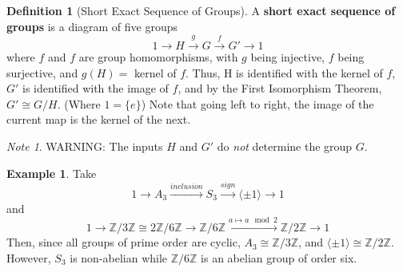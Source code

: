 \documentclass[12pt]{article}
\theoremstyle{definition}
\newtheorem{defn}[thm]{Definition}
\newtheorem{eg}[thm]{Example}
\theoremstyle{remark}
\newtheorem*{note}{Note} %
\numberwithin{equation}{section}
\newcommand\Z{\mathbb Z}    %
\newcommand\B[1]{\textbf{ #1}}
\begin{document}
\begin{defn}[Short Exact Sequence of Groups]
        A \B{short exact sequence of groups} is a diagram of five groups \begin{equation}
                1 \rightarrow H \xrightarrow{g} G \xrightarrow{f} G' \rightarrow 1
        \end{equation}
        where $f$ and $f$ are group homomorphisms, with $g$ being injective, $f$ being surjective, and $g(H) = $ kernel of $f$. Thus, H is identified with the kernel of $f$, $G'$ is identified with the image of $f$, and by the First Isomorphism Theorem, $G' \cong G/H$. (Where $1 = \{e\}$) Note that going left to right, the image of the current map is the kernel of the next.
\end{defn}
\begin{note}
        WARNING: The inputs $H$ and $G'$ do \emph{not} determine the group $G$.
\end{note}
\begin{eg}
        Take \begin{equation}
                1 \rightarrow A_3 \xrightarrow{inclusion} S_3 \xrightarrow{sign} \langle \pm 1 \rangle \rightarrow 1
        \end{equation}
        and \begin{equation}
                1 \rightarrow \Z/3\Z \cong 2\Z/6\Z \rightarrow \Z/6\Z \xrightarrow{a \mapsto a\mod 2} \Z/2\Z \rightarrow 1
        \end{equation}
        Then, since all groups of prime order are cyclic, $A_3 \cong \Z/3\Z$, and $\langle \pm 1 \rangle \cong \Z/2\Z$. However, $S_3$ is non-abelian while $\Z/6\Z$ is an abelian group of order six.
\end{eg}

\vspace{15pt}
\end{document}
